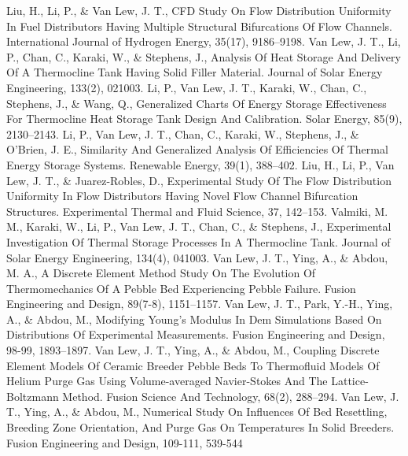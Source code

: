  {Liu, H., Li, P., \& Van Lew, J. T., CFD Study On Flow Distribution Uniformity In Fuel Distributors Having Multiple Structural Bifurcations Of Flow Channels. International Journal of Hydrogen Energy, 35(17), 9186–9198.}
 {Van Lew, J. T., Li, P., Chan, C., Karaki, W., \& Stephens, J., Analysis Of Heat Storage And Delivery Of A Thermocline Tank Having Solid Filler Material. Journal of Solar Energy Engineering, 133(2), 021003.}
 {Li, P., Van Lew, J. T., Karaki, W., Chan, C., Stephens, J., \& Wang, Q., Generalized Charts Of Energy Storage Effectiveness For Thermocline Heat Storage Tank Design And Calibration. Solar Energy, 85(9), 2130–2143.}
 {Li, P., Van Lew, J. T., Chan, C., Karaki, W., Stephens, J., \& O’Brien, J. E., Similarity And Generalized Analysis Of Efficiencies Of Thermal Energy Storage Systems. Renewable Energy, 39(1), 388–402.}
 {Liu, H., Li, P., Van Lew, J. T., \& Juarez-Robles, D., Experimental Study Of The Flow Distribution Uniformity In Flow Distributors Having Novel Flow Channel Bifurcation Structures. Experimental Thermal and Fluid Science, 37, 142–153.}
 {Valmiki, M. M., Karaki, W., Li, P., Van Lew, J. T., Chan, C., \& Stephens, J., Experimental Investigation Of Thermal Storage Processes In A Thermocline Tank. Journal of Solar Energy Engineering, 134(4), 041003.}
 {Van Lew, J. T., Ying, A., \& Abdou, M. A., A Discrete Element Method Study On The Evolution Of Thermomechanics Of A Pebble Bed Experiencing Pebble Failure. Fusion Engineering and Design, 89(7-8), 1151–1157.}
 {Van Lew, J. T., Park, Y.-H., Ying, A., \& Abdou, M., Modifying Young’s Modulus In Dem Simulations Based On Distributions Of Experimental Measurements. Fusion Engineering and Design, 98-99, 1893–1897.}
 {Van Lew, J. T., Ying, A., \& Abdou, M., Coupling Discrete Element Models Of Ceramic Breeder Pebble Beds To Thermofluid Models Of Helium Purge Gas Using Volume-averaged Navier-Stokes And The Lattice-Boltzmann Method. Fusion Science And Technology, 68(2), 288–294.}
 {Van Lew, J. T., Ying, A., \& Abdou, M., Numerical Study On Influences Of Bed Resettling, Breeding Zone Orientation, And Purge Gas On Temperatures In Solid Breeders. Fusion Engineering and Design, 109-111, 539-544}